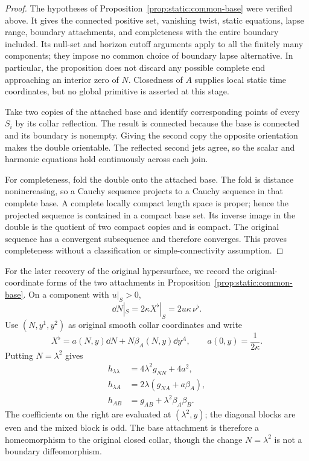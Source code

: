 \begin{proof}
The hypotheses of Proposition~\ref{prop:static:common-base} were
verified above. It gives the connected positive set, vanishing twist,
static equations, lapse range, boundary attachments, and completeness
with the entire boundary included. Its null-set and horizon cutoff
arguments apply to all the finitely many components; they impose no
common choice of boundary lapse alternative. In particular, the
proposition does not discard any possible complete end approaching
an interior zero of \(N\). Closedness of \(A\) supplies local static
time coordinates, but no global primitive is asserted at this stage.

Take two copies of the attached base and identify corresponding
points of every \(S_i\) by its collar reflection. The result is
connected because the base is connected and its boundary is nonempty.
Giving the second copy the opposite orientation makes the double
orientable. The reflected second jets agree, so the scalar and
harmonic equations hold continuously across each join.

For completeness, fold the double onto the attached base. The fold
is distance nonincreasing, so a Cauchy sequence projects to a Cauchy
sequence in that complete base. A complete locally compact length
space is proper; hence the projected sequence is contained in a
compact base set. Its inverse image in the double is the quotient
of two compact copies and is compact. The original sequence has a
convergent subsequence and therefore converges. This proves
completeness without a classification or simple-connectivity assumption.
\end{proof}

For the later recovery of the original hypersurface, we record the
original-coordinate forms of the two attachments in
Proposition~\ref{prop:static:common-base}. On a component with
\(u|_S>0\),
\begin{equation}
\label{q3:static:simple-norm}
\dd N|_S=2\kappa X^\flat|_S=2u\kappa\,\nu^\flat .
\end{equation}
Use \((N,y^1,y^2)\) as original smooth collar coordinates and write
\[
X^\flat=a(N,y)\dd N+N\beta_A(N,y)\dd y^A,\qquad
 a(0,y)=\frac1{2\kappa}.
\]
Putting \(N=\lambda^2\) gives
\begin{equation}
\label{q3:static:even-base}
\begin{aligned}
h_{\lambda\lambda}&=4\lambda^2g_{NN}+4a^2,\\
h_{\lambda A}&=2\lambda(g_{NA}+a\beta_A),\\
h_{AB}&=g_{AB}+\lambda^2\beta_A\beta_B.
\end{aligned}
\end{equation}
The coefficients on the right are evaluated at \((\lambda^2,y)\);
the diagonal blocks are even and the mixed block is odd. The base
attachment is therefore a homeomorphism to the original closed
collar, though the change \(N=\lambda^2\) is not a boundary
diffeomorphism.

